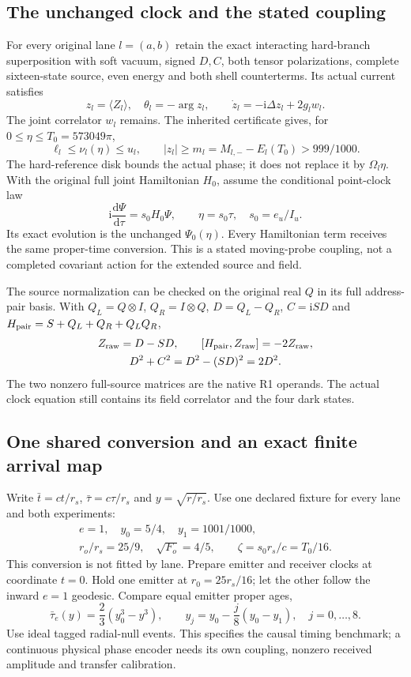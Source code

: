 \documentclass[10pt,twocolumn,letterpaper]{article}
\newcommand{\dd}{\mathrm{d}}
\newcommand{\ii}{\mathrm{i}}
\begin{document}
\subsection{The unchanged clock and the stated coupling}
For every original lane $l=(a,b)$ retain the exact interacting hard-branch
superposition with soft vacuum, signed $D,C$, both tensor polarizations,
complete sixteen-state source, even energy and both shell counterterms.
Its actual current satisfies
\[
 z_l=\langle Z_l\rangle,\quad \theta_l=-\arg z_l,\qquad
 \dot z_l=-\ii\Delta z_l+2g_lw_l.
\]
The joint correlator $w_l$ remains. The inherited certificate gives, for
$0\le\eta\le T_0=573049\pi$,
\[
 \ell_l\le\nu_l(\eta)\le u_l,\qquad
 |z_l|\ge m_l=M_{l,-}-E_l(T_0)>999/1000.
\]
The hard-reference disk bounds the actual phase; it does not replace it by
$\Omega_l\eta$. With the original full joint Hamiltonian $H_0$, assume the
conditional point-clock law
\[
 \ii\frac{\dd\Psi}{\dd\tau}=s_0H_0\Psi,\qquad
 \eta=s_0\tau,\quad s_0=e_u/I_u.
\]
Its exact evolution is the unchanged $\Psi_0(\eta)$. Every Hamiltonian term
receives the same proper-time conversion. This is a stated moving-probe
coupling, not a completed covariant action for the extended source and field.

The source normalization can be checked on the original real $Q$ in its full
address-pair basis. With $Q_L=Q\otimes I$, $Q_R=I\otimes Q$,
$D=Q_L-Q_R$, $C=\ii SD$ and
$H_{\rm pair}=S+Q_L+Q_R+Q_LQ_R$,
\[
 \begin{gathered}
 Z_{\rm raw}=D-SD,\qquad
 [H_{\rm pair},Z_{\rm raw}]=-2Z_{\rm raw},\\
 D^2+C^2=D^2-(SD)^2=2D^2.
 \end{gathered}
\]
The two nonzero full-source matrices are the native R1 operands. The actual
clock equation still contains its field correlator and the four dark states.

\subsection{One shared conversion and an exact finite arrival map}
Write $\bar t=ct/r_s$, $\bar\tau=c\tau/r_s$ and $y=\sqrt{r/r_s}$.
Use one declared fixture for every lane and both experiments:
\[
 \begin{gathered}
 e=1,\quad y_0=5/4,\quad y_1=1001/1000,\\
 r_o/r_s=25/9,\quad \sqrt{F_o}=4/5,\qquad
 \zeta=s_0r_s/c=T_0/16.
 \end{gathered}
\]
This conversion is not fitted by lane. Prepare emitter and receiver clocks
at coordinate $t=0$. Hold one emitter at $r_0=25r_s/16$; let the other follow
the inward $e=1$ geodesic. Compare equal emitter proper ages,
\[
 \bar\tau_e(y)=\frac23(y_0^3-y^3),\qquad
 y_j=y_0-\frac j8(y_0-y_1),\quad j=0,\ldots,8.
\]
Use ideal tagged radial-null events. This specifies the causal timing
benchmark; a continuous physical phase encoder needs its own coupling,
nonzero received amplitude and transfer calibration.
\end{document}
